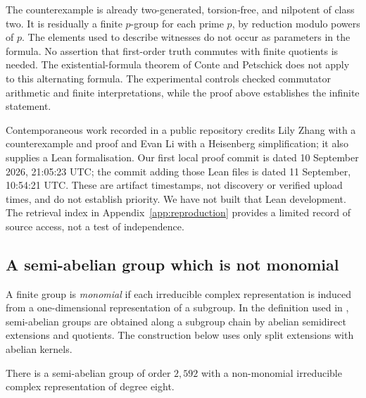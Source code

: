 The counterexample is already two-generated, torsion-free, and
nilpotent of class two. It is residually a finite $p$-group for
each prime $p$, by reduction modulo powers of $p$.
The elements used to describe witnesses do not occur as parameters
in the formula. No assertion that first-order truth commutes with
finite quotients is needed. The existential-formula theorem of
Conte and Petschick does not apply to this alternating formula.
The experimental controls checked commutator arithmetic and finite
interpretations, while the proof above establishes the infinite
statement.

Contemporaneous work recorded in a public repository credits Lily Zhang
with a counterexample and proof and Evan Li with a Heisenberg
simplification; it also supplies a Lean formalisation\cite{zhang-li-concise}.
Our first local proof commit is dated 10 September 2026, 21:05:23 UTC;
the commit adding those Lean files is dated 11 September, 10:54:21 UTC.
These are artifact timestamps, not discovery or verified upload times,
and do not establish priority. We have not built that Lean development.
The retrieval index in Appendix~\ref{app:reproduction} provides a limited
record of source access, not a test of independence.

\subsection{A semi-abelian group which is not monomial}
\label{subsec:semiabelian}

A finite group is \emph{monomial} if each irreducible complex
representation is induced from a one-dimensional representation of
a subgroup. In the definition used in , semi-abelian
groups are obtained along a subgroup chain by abelian semidirect
extensions and quotients. The construction below uses only split
extensions with abelian kernels.

\begin{theorem}
\label{thm:semiabelian}
There is a semi-abelian group of order $2,592$ with a non-monomial
irreducible complex representation of degree eight.
\end{theorem}

